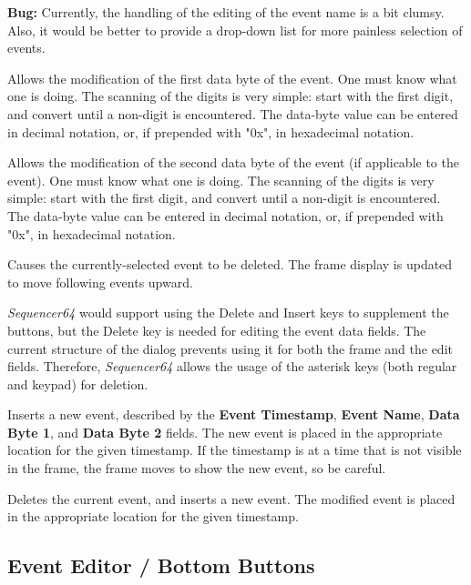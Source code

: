    \textbf{Bug:}
   Currently, the handling of the editing of the event name is a bit clumsy.
   Also, it would be better to provide a drop-down list for more painless
   selection of events.

   Allows the modification of the first data byte of the event.
   One must know what one is doing.
   The scanning of the digits is very simple:  start with the first digit, and
   convert until a non-digit is encountered.  The data-byte value can be
   entered in decimal notation, or, if prepended with "0x", in hexadecimal
   notation.

   Allows the modification of the second data byte of the event (if applicable
   to the event).
   One must know what one is doing.
   The scanning of the digits is very simple:  start with the first digit, and
   convert until a non-digit is encountered.  The data-byte value can be
   entered in decimal notation, or, if prepended with "0x", in hexadecimal
   notation.

   Causes the currently-selected event to be deleted.
   The frame display is updated to move following events upward.

   \textsl{Sequencer64} would support using the Delete and Insert keys to
   supplement the buttons, but the Delete key is needed for editing the event
   data fields.  The current structure of the dialog prevents using it for both
   the frame and the edit fields.  Therefore, \textsl{Sequencer64} allows the
   usage of the asterisk keys (both regular and keypad) for
   deletion.

   Inserts a new event, described by the 
   \textbf{Event Timestamp},
   \textbf{Event Name},
   \textbf{Data Byte 1}, and
   \textbf{Data Byte 2} fields.
   The new event is placed in the appropriate location for the given timestamp.
   If the timestamp is at a time that is not visible in the frame, the frame
   moves to show the new event, so be careful.

   Deletes the current event, and inserts a new event.
   The modified event is placed in the appropriate location for the given
   timestamp.

\subsection{Event Editor / Bottom Buttons}
\label{subsec:seq64_event_editor_buttons}

